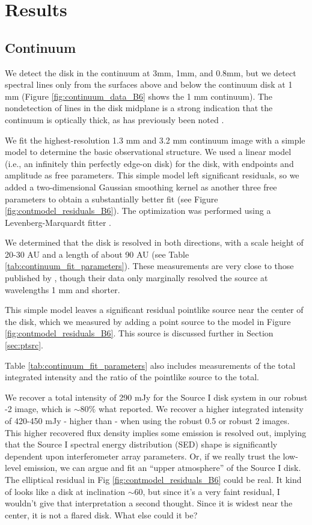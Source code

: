 \documentclass[twocolumn]{aastex61}
\begin{document}
\section{Results}

\subsection{Continuum}
We detect the disk in the continuum at 3mm, 1mm, and 0.8mm, but we detect
spectral lines only from the surfaces above and below the continuum disk at 1
mm (Figure \ref{fig:continuum_data_B6} shows the 1 mm continuum).  The nondetection of
lines in the disk midplane is a strong indication that the continuum is
optically thick, as has previously been noted
\citep[e.g.][]{Plambeck2016a}.

We fit the highest-resolution 1.3 mm and 3.2 mm continuum image with a simple
model to determine the basic
observational structure.  We used a linear model (i.e., an infinitely thin
perfectly edge-on disk) for the disk, with endpoints and amplitude as free parameters.
This simple model left significant residuals, so we added a two-dimensional
Gaussian smoothing kernel as another three free parameters to obtain a
substantially better fit (see Figure \ref{fig:contmodel_residuals_B6}).
The optimization was performed using a Levenberg-Marquardt
fitter \citep{Newville2014a}. %

We determined that the disk is resolved in both
directions, with a scale height of 20-30 AU and a length of about
90 AU (see Table \ref{tab:continuum_fit_parameters}).  These measurements
are very close to those published by \citet{Plambeck2016a}, though their data
only marginally resolved the source at wavelengths 1 mm and shorter.

This simple model leaves a significant residual pointlike source near
the center of the disk, which we measured by adding a point
source to the model in Figure \ref{fig:contmodel_residuals_B6}.
This source is discussed further in Section \ref{sec:ptsrc}.

Table \ref{tab:continuum_fit_parameters} also includes measurements
of the total integrated intensity and the ratio of the pointlike source to
the total.

We recover a total intensity of 290 mJy for the Source I disk
system in our robust -2 image, which is  $\sim80\%$ what
\citet{Plambeck2016a} reported.  We recover a higher integrated intensity of
420-450 mJy - higher than \citet{Plambeck2016a} - when using the robust 0.5 
or robust 2 images.  This higher recovered flux density implies some emission
is resolved out, implying that the Source I spectral energy distribution (SED)
shape is significantly dependent upon interferometer array parameters.
{\color{red} Or, if we really trust the low-level emission, we can argue
and fit an ``upper atmosphere'' of the Source I disk.  The elliptical
residual in Fig \ref{fig:contmodel_residuals_B6} could be real.
It kind of looks like a disk at inclination $\sim60$, but since it's a
very faint residual, I wouldn't give that interpretation a second thought.
Since it is widest near the center, it is not a flared disk.  What
else could it be?}
\end{document}
